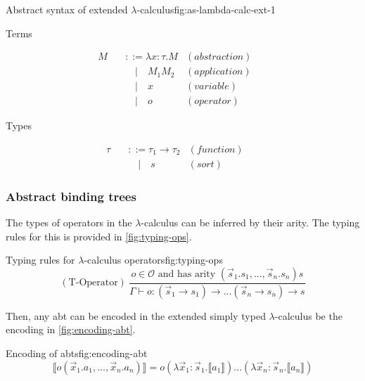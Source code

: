 \begin{myfigure}{Abstract syntax of extended $\lambda$-calculus}{fig:as-lambda-calc-ext-1}
    \begin{center}
        Terms
    \end{center}
    \[
        \begin{aligned}
            M \quad & ::= \lambda x : \tau.M & (abstraction) &  & \\
                    & \quad | \quad M_1 M_2  & (application) &  & \\
                    & \quad | \quad x        & (variable)    &  & \\
                    & \quad | \quad o        & (operator)
        \end{aligned}
    \]

    \begin{center}
        Types
    \end{center}
    \[
        \begin{aligned}
            \tau \quad & ::= \tau_1 \rightarrow \tau_2 & (function) &  & \\
                       & \quad | \quad s               & (sort)
        \end{aligned}
    \]
\end{myfigure}

\subsubsection{Abstract binding trees}

The types of operators in the $\lambda$-calculus can be inferred by their arity. The typing rules for this is provided in \cref{fig:typing-ops}.

\begin{myfigure}{Typing rules for $\lambda$-calculus operators}{fig:typing-ops}
    \[
        (\text{T-Operator}) \ \frac{o \in \mathcal{O} \text{ and has arity } (\Vec{s}_1.s_1,...,\Vec{s}_n.s_n)s}{\Gamma \vdash o : (\Vec{s}_1 \rightarrow s_1) \rightarrow ... (\Vec{s}_n \rightarrow s_n) \rightarrow s}
    \]
\end{myfigure}

Then, any abt can be encoded in the extended simply typed $\lambda$-calculus be the encoding in \cref{fig:encoding-abt}.

\begin{myfigure}{Encoding of abts}{fig:encoding-abt}
    \[
        \llbracket o(\Vec{x}_1.a_1,...,\Vec{x}_n.a_n) \rrbracket = o(\lambda \Vec{x}_1:\Vec{s}_1.\llbracket a_1 \rrbracket)...(\lambda \Vec{x}_n : \Vec{s}_n.\llbracket a_n \rrbracket)
    \]
\end{myfigure}

